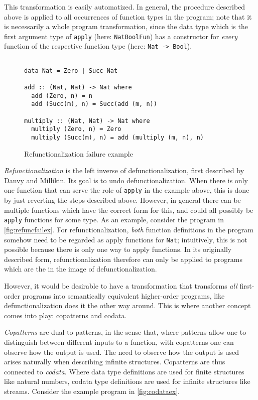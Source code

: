 This transformation is easily automatized. In general, the procedure described above is applied to all occurrences of function types in the program; note that it is necessarily a whole program transformation, since the data type which is the first argument type of \texttt{apply} (here: \texttt{NatBoolFun}) has a constructor for \textit{every} function of the respective function type (here: \texttt{Nat -> Bool}).

\begin{figure}
\begin{lstlisting}

data Nat = Zero | Succ Nat

add :: (Nat, Nat) -> Nat where
  add (Zero, n) = n
  add (Succ(m), n) = Succ(add (m, n))

multiply :: (Nat, Nat) -> Nat where
  multiply (Zero, n) = Zero
  multiply (Succ(m), n) = add (multiply (m, n), n)

\end{lstlisting}
\caption{Refunctionalization failure example}
\label{fig:refuncfailex}
\end{figure}

\textit{Refunctionalization} is the left inverse of defunctionalization, first described by Danvy and Millikin\cite{danvy09refunctionalization}. Its goal is to undo defunctionalization. When there is only one function that can serve the role of \texttt{apply} in the example above, this is done by just reverting the steps described above. However, in general there can be multiple functions which have the correct form for this, and could all possibly be \texttt{apply} functions for some type. As an example, consider the program in \autoref{fig:refuncfailex}. For refunctionalization, \textit{both} function definitions in the program somehow need to be regarded as apply functions for \texttt{Nat}; intuitively, this is not possible because there is only one way to apply functions. In its originally described form, refunctionalization therefore can only be applied to programs which are the in the image of defunctionalization.

However, it would be desirable to have a transformation that transforms \textit{all} first-order programs into semantically equivalent higher-order programs, like defunctionalization does it the other way around. This is where another concept comes into play: copatterns and codata.

\textit{Copatterns} are dual to patterns, in the sense that, where patterns allow one to distinguish between different inputs to a function, with copatterns one can observe how the output is used. The need to observe how the output is used arises naturally when describing infinite structures. Copatterns are thus connected to \textit{codata}. Where data type definitions are used for finite structures like natural numbers, codata type definitions are used for infinite structures like streams. Consider the example program in \autoref{fig:codataex}.

